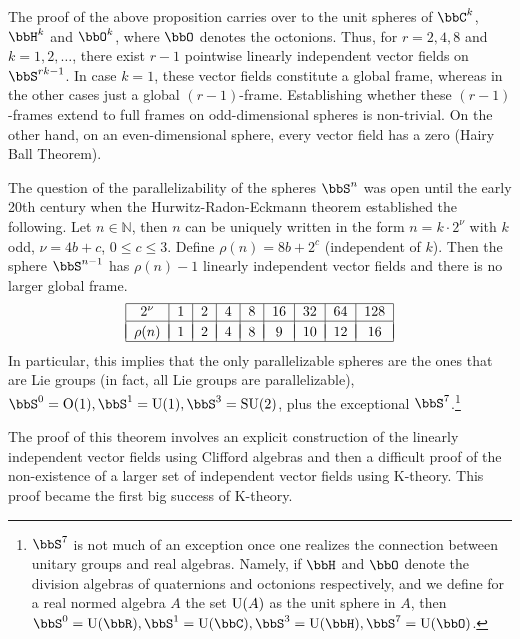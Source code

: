 \begin{rem}
    The proof of the above proposition carries over to the unit spheres of $\bbC^k$, $\bbH^k$ and $\bbO^k$, where $\bbO$ denotes the octonions. Thus, for $r=2,4,8$ and $k=1,2,\ldots$, there exist $r-1$ pointwise linearly independent vector fields on $\bbS^{rk-1}$. In case $k=1$, these vector fields constitute a global frame, whereas in the other cases just a global $(r-1)$-frame. Establishing whether these $(r-1)$-frames extend to full frames on odd-dimensional spheres is non-trivial. On the other hand, on an even-dimensional sphere, every vector field has a zero (Hairy Ball Theorem).

    The question of the parallelizability of the spheres $\bbS^n$ was open until the early 20th century when the Hurwitz-Radon-Eckmann theorem established the following. Let $n\in\mathbb{N}$, then $n$ can be uniquely written in the form $n=k\cdot 2^\nu$ with $k$ odd, $\nu=4b+c$, $0\leq c\leq 3$. Define $\rho(n)=8b+2^c$ (independent of $k$). Then the sphere $\bbS^{n-1}$ has $\rho(n)-1$ linearly independent vector fields and there is no larger global frame. 
    \[\begin{tabular}{|c|c|c|c|c|c|c|c|c|}
    \hline 
    $2^\nu$ & 1 & 2 & 4 & 8 & 16 & 32 & 64 & 128\tabularnewline
    \hline &&&&&&&&\\[-1em]
    $\rho(n)$ &1 & 2 & 4 & 8 & 9 & 10 & 12 & 16\tabularnewline
    \hline 
    \end{tabular}\]
    In particular, this implies that the only parallelizable spheres are the ones that are Lie groups (in fact, all Lie groups are parallelizable), $\bbS^0=\rm{O}(1),\bbS^1=\rm{U}(1),\bbS^3=\rm{SU}(2)$, plus the exceptional $\bbS^7$.\footnote{$\bbS^7$ is not much of an exception once one realizes the connection between unitary groups and real algebras. Namely, if $\bbH $ and $\bbO$ denote the division algebras of quaternions and octonions respectively, and we define for a real normed algebra $A$ the set ${\rm U}(A)$ as the unit sphere in $A$, then $\bbS^0=\rm{U}(\bbR ),\bbS^1=\rm{U}(\bbC),\bbS^3=\rm{U}(\bbH),\bbS^7=\rm{U}(\bbO)$.}
    
    The proof of this theorem involves an explicit construction of the linearly independent vector fields using Clifford algebras and then a difficult proof of the non-existence of a larger set of independent vector fields using K-theory. This proof became the first big success of K-theory.
\end{rem}



